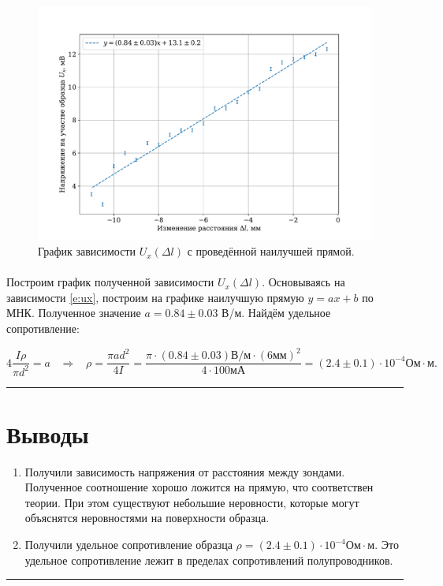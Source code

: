 \documentclass[a4paper,12pt]{article} %
\begin{document}
\begin{figure}
\centering
\includegraphics[width=\textwidth]{plot.pdf}
\caption{График зависимости $U_x(\Delta l)$ с проведённой наилучшей прямой.}
\label{fig:plot}
\end{figure}

\paragraph{} Построим график полученной зависимости $U_x(\Delta l)$. Основываясь на зависимости \eqref{e:ux}, построим на графике наилучшую прямую $y = ax + b$ по МНК. Полученное значение $a = 0.84 \pm 0.03$ В/м. Найдём удельное сопротивление:

\begin{equation}
4 \frac{I \rho}{\pi d^2} = a \;\;\; \Rightarrow \;\;\; \rho = \frac{\pi a d^2}{4I} = \frac{\pi \cdot (0.84 \pm 0.03) \text{В/м} \cdot (6 \text{мм})^2}{4 \cdot 100 \text{мА}} = (2.4 \pm 0.1) \cdot 10^{-4} \text{Ом} \cdot  \text{м}.
\label{e:rho}
\end{equation}



\medskip\hrule\medskip

\section{Выводы}

\begin{enumerate}
\item Получили зависимость напряжения от расстояния между зондами. Полученное соотношение хорошо ложится на прямую, что соответствен теории. При этом существуют небольшие неровности, которые могут объяснятся неровностями на поверхности образца.
\item Получили удельное сопротивление образца $\rho = (2.4 \pm 0.1) \cdot 10^{-4} \text{Ом} \cdot  \text{м}$. Это удельное сопротивление лежит в пределах сопротивлений полупроводников.
\end{enumerate}

\medskip\hrule\medskip
\end{document}
